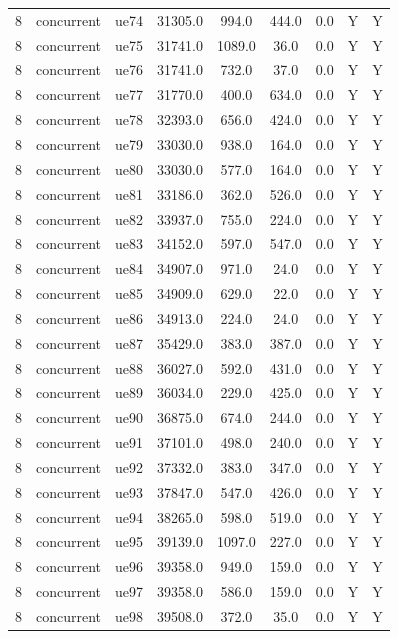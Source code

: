 \begin{table}[ht]
\begin{tabular}{|c|c|c|c|c|c|c|c|c|}
8 & concurrent & ue74 & 31305.0 & 994.0 & 444.0 & 0.0 & Y & Y \\
8 & concurrent & ue75 & 31741.0 & 1089.0 & 36.0 & 0.0 & Y & Y \\
8 & concurrent & ue76 & 31741.0 & 732.0 & 37.0 & 0.0 & Y & Y \\
8 & concurrent & ue77 & 31770.0 & 400.0 & 634.0 & 0.0 & Y & Y \\
8 & concurrent & ue78 & 32393.0 & 656.0 & 424.0 & 0.0 & Y & Y \\
8 & concurrent & ue79 & 33030.0 & 938.0 & 164.0 & 0.0 & Y & Y \\
8 & concurrent & ue80 & 33030.0 & 577.0 & 164.0 & 0.0 & Y & Y \\
8 & concurrent & ue81 & 33186.0 & 362.0 & 526.0 & 0.0 & Y & Y \\
8 & concurrent & ue82 & 33937.0 & 755.0 & 224.0 & 0.0 & Y & Y \\
8 & concurrent & ue83 & 34152.0 & 597.0 & 547.0 & 0.0 & Y & Y \\
8 & concurrent & ue84 & 34907.0 & 971.0 & 24.0 & 0.0 & Y & Y \\
8 & concurrent & ue85 & 34909.0 & 629.0 & 22.0 & 0.0 & Y & Y \\
8 & concurrent & ue86 & 34913.0 & 224.0 & 24.0 & 0.0 & Y & Y \\
8 & concurrent & ue87 & 35429.0 & 383.0 & 387.0 & 0.0 & Y & Y \\
8 & concurrent & ue88 & 36027.0 & 592.0 & 431.0 & 0.0 & Y & Y \\
8 & concurrent & ue89 & 36034.0 & 229.0 & 425.0 & 0.0 & Y & Y \\
8 & concurrent & ue90 & 36875.0 & 674.0 & 244.0 & 0.0 & Y & Y \\
8 & concurrent & ue91 & 37101.0 & 498.0 & 240.0 & 0.0 & Y & Y \\
8 & concurrent & ue92 & 37332.0 & 383.0 & 347.0 & 0.0 & Y & Y \\
8 & concurrent & ue93 & 37847.0 & 547.0 & 426.0 & 0.0 & Y & Y \\
8 & concurrent & ue94 & 38265.0 & 598.0 & 519.0 & 0.0 & Y & Y \\
8 & concurrent & ue95 & 39139.0 & 1097.0 & 227.0 & 0.0 & Y & Y \\
8 & concurrent & ue96 & 39358.0 & 949.0 & 159.0 & 0.0 & Y & Y \\
8 & concurrent & ue97 & 39358.0 & 586.0 & 159.0 & 0.0 & Y & Y \\
8 & concurrent & ue98 & 39508.0 & 372.0 & 35.0 & 0.0 & Y & Y \\

\end{tabular}
\end{table}

